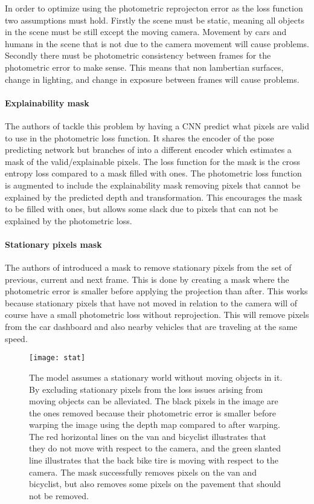 In order to optimize using the photometric reprojecton error as the loss function two assumptions must hold. Firstly the scene must be static, meaning all objects in the scene must be still except the moving camera. Movement by cars and humans in the scene that is not due to the camera movement will cause problems. Secondly there must be photometric consistency between frames for the photometric error to make sense. This means that non lambertian surfaces, change in lighting, and change in exposure between frames will cause problems.

\paragraph{Explainability mask} The authors of \cite{sfmlearner} tackle this problem by having a CNN predict what pixels are valid to use in the photometric loss function. It shares the encoder of the pose predicting network but branches of into a different encoder which estimates a mask of the valid/explainable pixels. The loss function for the mask is the cross entropy loss compared to a mask filled with ones. The photometric loss function is augmented to include the explainability mask removing pixels that cannot be explained by the predicted depth and transformation. This encourages the mask to be filled with ones, but allows some slack due to pixels that can not be explained by the photometric loss.

\paragraph{Stationary pixels mask} The authors of \cite{monodepth2} introduced a mask to remove stationary pixels from the set of previous, current and next frame. This is done by creating a mask where the photometric error is smaller before applying the projection than after. This works because stationary pixels that have not moved in relation to the camera will of course have a small photometric loss without reprojection. This will remove pixels from the car dashboard and also nearby vehicles that are traveling at the same speed.

\begin{figure}[H]
	\centering
	\texttt{[image: stat]}
	\caption{The model assumes a stationary world without moving objects in it. By excluding stationary pixels from the loss issues arising from moving objects can be alleviated. The black pixels in the image are the ones removed because their photometric error is smaller before warping the image using the depth map compared to after warping. The red horizontal lines on the van and bicyclist illustrates that they do not move with respect to the camera, and the green slanted line illustrates that the back bike tire is moving with respect to the camera. The mask successfully removes pixels on the van and bicyclist, but also removes some pixels on the pavement that should not be removed.}
	\label{fig:stat}
\end{figure}